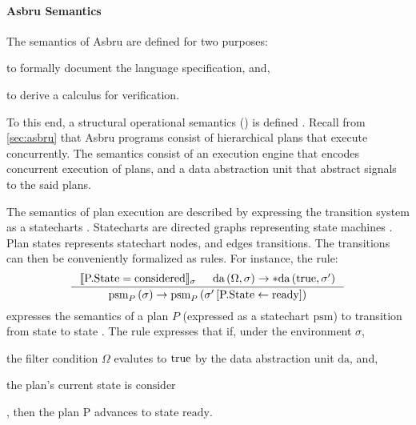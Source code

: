 \paragraph{Asbru Semantics}

The semantics of Asbru are defined for two purposes:
\begin{enumerate*}[label=(\alph*)]
  \item to formally document the language specification, and,
  \item to derive a calculus for verification.
\end{enumerate*}
To this end, a structural operational semantics (\SOS{})
is defined \cite{TuriLICS97}.
Recall from \autoref{sec:asbru} that Asbru programs
consist of hierarchical plans that execute concurrently.
The semantics consist of an execution engine that encodes
concurrent execution of plans, and a data abstraction
unit that abstract signals to the said plans.

The semantics of plan execution are described by
expressing the transition system as a statecharts \cite{DammCOMPOS97}.
Statecharts are directed graphs representing state machines \cite{BalserICIDP02}.
Plan states represents statechart nodes, and edges transitions. The transitions
can then be conveniently formalized as \SOS{} rules. For instance, the rule:
$$
\inference{\llbracket \text{P.State}=\text{considered}\rrbracket_{\sigma} &
\text{da}\left(\Omega, \sigma \right) \rightarrow \ast\text{da}\left(\true{},
\sigma^{\prime}\right)}
{\text{psm}_P\left(\sigma\right) \rightarrow
\text{psm}_P\left(\sigma^{\prime}\left[\text{P.State} \leftarrow
\text{ready}\right]\right)}
$$
expresses the semantics of a plan $P$ (expressed as a statechart $\text{psm}$)
to transition from state 
to state . The \SOS{} rule expresses that
if, under the environment $\sigma$,
\begin{enumerate*}[label=(\alph*)]
  \item the filter condition $\Omega$ evalutes to $\text{true}$ by the data
    abstraction unit $\text{da}$, and,
  \item the plan's current state is $\text{consider}$
\end{enumerate*},
then the plan $\text{P}$ advances to state $\text{ready}$.

